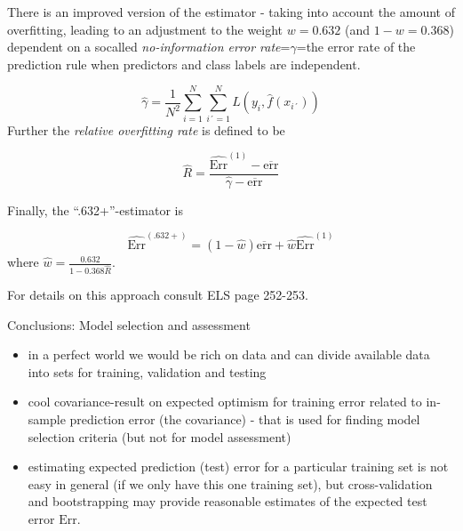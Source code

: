 \documentclass[
  ignorenonframetext,
]{beamer}
\providecommand{\tightlist}{%
  \setlength{\itemsep}{0pt}\setlength{\parskip}{0pt}}
\begin{document}
\begin{frame}

There is an improved version of the estimator - taking into account the
amount of overfitting, leading to an adjustment to the weight
\(w=0.632\) (and \(1-w=0.368\)) dependent on a socalled
\emph{no-information error rate}=\(\gamma\)=the error rate of the
prediction rule when predictors and class labels are independent.

\[\hat{\gamma}=\frac{1}{N^2}\sum_{i=1}^{N}\sum_{i´=1}^N L(y_i,\hat{f}(x_{i´}))\]
Further the \emph{relative overfitting rate} is defined to be

\[ \hat{R}=\frac{\widehat{\text{Err}}^{(1)}-\overline{\text{err}}}{\hat{\gamma}-\overline{\text{err}}}\]

\end{frame}

\begin{frame}

Finally, the ``.632+''-estimator is

\[\widehat{\text{Err}}^{(.632+)}=(1-\hat{w}) \overline{\text{err}}+ \hat{w} \widehat{\text{Err}}^{(1)}\]
where \(\hat{w}=\frac{0.632}{1-0.368 \hat{R}}\).

For details on this approach consult ELS page 252-253.

\end{frame}

\begin{frame}{Conclusions: Model selection and assessment}
\protect\hypertarget{conclusions-model-selection-and-assessment}{}

\begin{itemize}
\tightlist
\item
  in a perfect world we would be rich on data and can divide available
  data into sets for training, validation and testing
\item
  cool covariance-result on expected optimism for training error related
  to in-sample prediction error (the covariance) - that is used for
  finding model selection criteria (but not for model assessment)
\item
  estimating expected prediction (test) error for a particular training
  set is not easy in general (if we only have this one training set),
  but cross-validation and bootstrapping may provide reasonable
  estimates of the expected test error \(\text{Err}\).
\end{itemize}

\end{frame}
\end{document}
